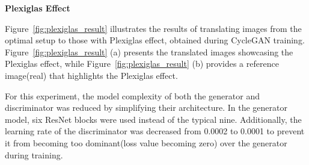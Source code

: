 \documentclass[12pt,DIV14,BCOR12mm,a4paper,footinclude=false,headinclude,parskip=half-,twoside,openright,cleardoublepage=empty,toc=index,bibliography=totoc,listof=totoc]{scrreprt}
\numberwithin{equation}{chapter}
\begin{document}
\textbf{Plexiglas Effect}

Figure~\ref{fig:plexiglas_result} illustrates the results of translating images from the optimal setup to those with Plexiglas effect, obtained during CycleGAN training. Figure~\ref{fig:plexiglas_result} (a) presents the translated images showcasing the Plexiglas effect, while Figure~\ref{fig:plexiglas_result} (b) provides a reference image(real) that highlights the Plexiglas effect. 

For this experiment, the model complexity of both the generator and discriminator was reduced by simplifying their architecture. In the generator model, six ResNet blocks were used instead of the typical nine. Additionally, the learning rate of the discriminator was decreased from 0.0002 to 0.0001 to prevent it from becoming too dominant(loss value becoming zero) over the generator during training.
\end{document}
